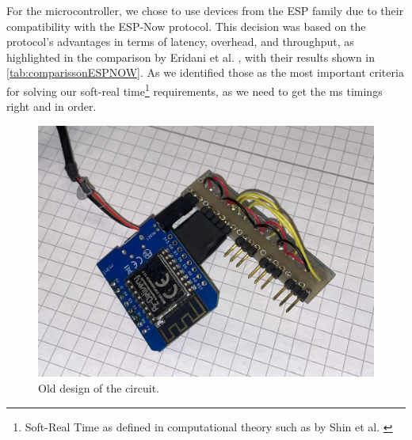 \begin{table}
    \centering
    \caption{Comparison of Wi-Fi, Bluetooth and Esp-Now \cite{eridani2021comparative}.\\EE stands for Energy Efficiency, R stands for receiver and T for transmitter.}
    \label{tab:comparissonESPNOW}
\end{table}

For the microcontroller, we chose to use devices from the ESP family due to their compatibility with the ESP-Now protocol. This decision was based on the protocol's advantages in terms of latency, overhead, and throughput, as highlighted in the comparison by Eridani et al. \cite{eridani2021comparative}, with their results shown in \autoref{tab:comparissonESPNOW}. As we identified those as the most important criteria for solving our  soft-real time\footnote{Soft-Real Time as defined in computational theory such as by Shin et al. \cite{shin1994real}} requirements, as we need to get the ms timings right and in order.

\begin{figure}
    \centering
    \includegraphics[width=0.5\linewidth]{src/pictures/GloveDesigns/oldDesign.jpg}
    \caption{Old design of the circuit.}
    \label{fig:oldDesign}
\end{figure}

